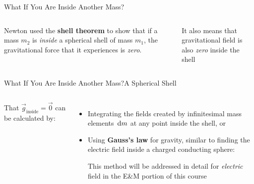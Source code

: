 \documentclass[12pt,compress,aspectratio=169]{beamer}
\begin{document}
\begin{frame}{What If You Are Inside Another Mass?}
  \begin{columns}

    Newton used the \textbf{shell theorem} to show that if a mass $m_2$ is
    \emph{inside} a spherical shell of mass $m_1$, the gravitational force that
    it experiences is \emph{zero}.
      
      
    It also means that gravitational field is also \emph{zero} inside the shell
  \end{columns}
\end{frame}



\begin{frame}{What If You Are Inside Another Mass?}{A Spherical Shell}
  \begin{columns}

    That $\vec g_\text{inside}=\vec 0$ can be calculated by:
    \begin{itemize}
    \item Integrating the fields created by infinitesimal mass elements $\dl m$
      at any point inside the shell, or
    \item Using \textbf{Gauss's law} for gravity, similar to finding the
      electric field inside a charged conducting sphere:
      

      \vspace{-.07in}This method will be addressed in detail for
      \emph{electric} field in the E\&M portion of this course
    \end{itemize}
  \end{columns}
\end{frame}
\end{document}
